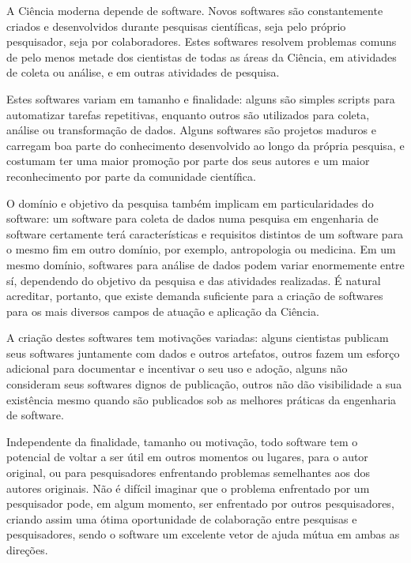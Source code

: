 


A Ciência moderna depende de software. Novos softwares são constantemente
criados e desenvolvidos durante pesquisas científicas, seja pelo próprio pesquisador,
seja por colaboradores. 
Estes softwares resolvem problemas comuns de pelo menos metade dos cientistas 
de todas as áreas da Ciência, em atividades de coleta ou análise, 
e em outras atividades de pesquisa.

Estes softwares variam em tamanho e finalidade: alguns são simples
scripts para automatizar tarefas repetitivas, enquanto outros são utilizados para
coleta, análise ou transformação de dados. Alguns softwares são projetos maduros e
carregam boa parte do conhecimento desenvolvido ao longo da própria pesquisa, e
costumam ter uma maior promoção por parte dos seus autores e um maior
reconhecimento por parte da comunidade científica.

O domínio e objetivo da pesquisa também implicam em particularidades do software: 
um software para coleta de dados numa pesquisa em engenharia de
software certamente terá características e requisitos distintos de um software
para o mesmo fim em outro domínio, por exemplo,  antropologia ou medicina.
Em um mesmo domínio, softwares para análise de dados podem variar
enormemente entre sí, dependendo do objetivo da pesquisa e das atividades realizadas.
\'{E} natural acreditar, portanto, que existe demanda suficiente para a
criação de softwares para os mais diversos campos de atuação e aplicação da
Ciência.

A criação destes softwares tem motivações variadas:  alguns cientistas publicam
seus softwares juntamente com dados e outros artefatos, outros fazem um esforço
adicional para documentar e incentivar o seu uso e adoção, alguns não
consideram seus softwares dignos de publicação, outros não dão visibilidade a
sua existência mesmo quando são publicados sob as melhores práticas da
engenharia de software.

Independente da finalidade, tamanho ou motivação, todo software tem o potencial
de voltar a ser útil em outros momentos ou lugares, para o autor original,
ou para pesquisadores enfrentando problemas semelhantes aos dos autores originais.
Não é difícil imaginar que o problema enfrentado por um pesquisador pode, em
algum momento, ser enfrentado por outros pesquisadores, criando assim uma ótima
oportunidade de colaboração entre pesquisas e pesquisadores, sendo o software
um excelente vetor de ajuda mútua em ambas as direções.

